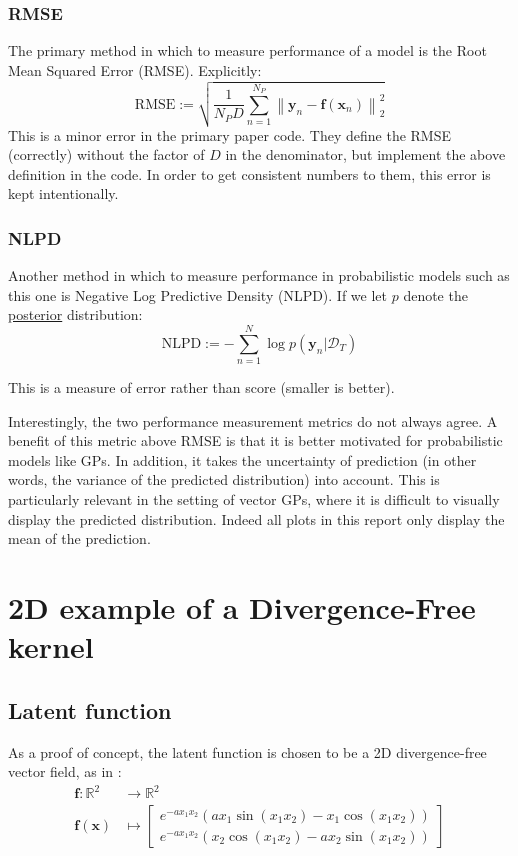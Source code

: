 \documentclass[12pt,a4paper,twoside]{report}
\theoremstyle{definition}
\begin{document}
\subsubsection{RMSE}
The primary method in which to measure performance of a model is the Root Mean Squared Error (RMSE)\label{RMSE}. Explicitly:
\begin{equation*}\label{norm}
	\text{RMSE}:=\sqrt{\frac{1}{N_PD}\sum_{n=1}^{N_P}\left\|\mathbf y_n-\mathbf f(\mathbf x_n)\right\|_2^2} 
\end{equation*}
This is a minor error in the primary paper code. They define the RMSE (correctly) without the factor of $D$ in the denominator, but implement the above definition in the code. In order to get consistent numbers to them, this error is kept intentionally.

\subsubsection{NLPD}\label{NLPD}
Another method in which to measure performance in probabilistic models such as this one is Negative Log Predictive Density (NLPD). If we let $p$ denote the \hyperref[posterior]{posterior} distribution:
\begin{equation*}
	\text{NLPD}:=-\sum_{n=1}^N \log p(\mathbf y_n|\mathcal D_T)
\end{equation*}

This is a measure of error rather than score (smaller is better).

Interestingly, the two performance measurement metrics do not always agree. A benefit of this metric above RMSE is that it is better motivated for probabilistic models like GPs. In addition, it takes the uncertainty of prediction (in other words, the variance of the predicted distribution) into account. This is particularly relevant in the setting of vector GPs, where it is difficult to visually display the predicted distribution. Indeed all plots in this report only display the mean of the prediction.

\section{2D example of a Divergence-Free kernel}
\subsection{Latent function}
As a proof of concept, the latent function is chosen to be a 2D divergence-free vector field, as in :
\begin{align*}
	\mathbf f:\mathbb{R}^2&\to\mathbb{R}^2\\
	\mathbf f(\mathbf x)&\mapsto \begin{bmatrix}e^{-a x_1 x_2}\left(a x_1 \sin \left(x_1 x_2\right)-x_1 \cos \left(x_1 x_2\right)\right)\\e^{-a x_1 x_2}\left(x_2 \cos \left(x_1 x_2\right)-a x_2 \sin \left(x_1 x_2\right)\right)\end{bmatrix}
\end{align*}
\end{document}
